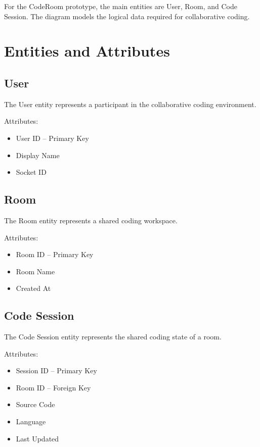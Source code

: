 \documentclass[12pt,a4paper,oneside]{report}
\begin{document}
For the CodeRoom prototype, the main entities are User, Room, and Code Session. The diagram models the logical data required for collaborative coding.

\section{Entities and Attributes}

\subsection{User}

The User entity represents a participant in the collaborative coding environment.

Attributes:

\begin{itemize}
    \item User ID -- Primary Key
    \item Display Name
    \item Socket ID
\end{itemize}

\subsection{Room}

The Room entity represents a shared coding workspace.

Attributes:

\begin{itemize}
    \item Room ID -- Primary Key
    \item Room Name
    \item Created At
\end{itemize}

\subsection{Code Session}

The Code Session entity represents the shared coding state of a room.

Attributes:

\begin{itemize}
    \item Session ID -- Primary Key
    \item Room ID -- Foreign Key
    \item Source Code
    \item Language
    \item Last Updated
\end{itemize}
\end{document}
